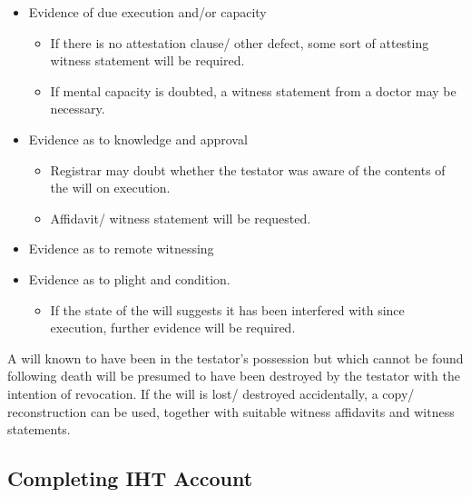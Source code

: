 \documentclass[
]{article}
\providecommand{\tightlist}{%
  \setlength{\itemsep}{0pt}\setlength{\parskip}{0pt}}
\begin{document}
\begin{itemize}
\tightlist
\item
  Evidence of due execution and/or capacity

  \begin{itemize}
  \tightlist
  \item
    If there is no attestation clause/ other defect, some sort of
    attesting witness statement will be required.
  \item
    If mental capacity is doubted, a witness statement from a doctor may
    be necessary.
  \end{itemize}
\item
  Evidence as to knowledge and approval

  \begin{itemize}
  \tightlist
  \item
    Registrar may doubt whether the testator was aware of the contents
    of the will on execution.
  \item
    Affidavit/ witness statement will be requested.
  \end{itemize}
\item
  Evidence as to remote witnessing
\item
  Evidence as to plight and condition.

  \begin{itemize}
  \tightlist
  \item
    If the state of the will suggests it has been interfered with since
    execution, further evidence will be required.
  \end{itemize}
\end{itemize}

A will known to have been in the testator's possession but which cannot
be found following death will be presumed to have been destroyed by the
testator with the intention of revocation. If the will is lost/
destroyed accidentally, a copy/ reconstruction can be used, together
with suitable witness affidavits and witness statements.

\hypertarget{completing-iht-account}{%
\subsection{Completing IHT Account}\label{completing-iht-account}}
\end{document}
